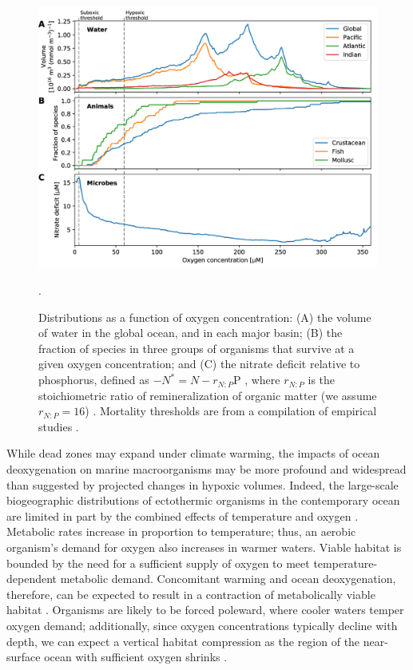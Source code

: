 \documentclass{report_chapter}
\begin{document}
\begin{figure}[p!]
\centering
\includegraphics[width=\textwidth]{woa_o2pdf_mortality_no3deficit.png}
\caption{Distributions as a function of oxygen concentration:
(A) the volume of water in the global ocean, and in each major basin; (B) the fraction of species in three groups of organisms that survive at a given oxygen concentration; and (C) the nitrate deficit relative to phosphorus, defined as ${-N^* = N - r_{N:P}\mathrm{P}}$ \protect\citep{Gruber-Sarmiento-1997}, where ${r_{N:P}}$ is the stoichiometric ratio of remineralization of organic matter (we assume ${r_{N:P} = 16}$) \protect\citep{Anderson-Sarmiento-1994}.  Mortality thresholds are from a compilation of empirical studies \citep{Vaquer-Sunyer-Duarte-2008}.}.
\label{fig:o2pdfs}
\end{figure}

While dead zones may expand under climate warming, the impacts of ocean deoxygenation on marine macroorganisms may be more profound and widespread than suggested by projected changes in hypoxic volumes.
Indeed, the large-scale biogeographic distributions of ectothermic organisms in the contemporary ocean are limited in part by the combined effects of temperature and oxygen \citep{Deutsch-Ferrel-etal-2015}.
Metabolic rates increase in proportion to temperature; thus, an aerobic organism's demand for oxygen also increases in warmer waters.
Viable habitat is bounded by the need for a sufficient supply of oxygen to meet temperature-dependent metabolic demand.
Concomitant warming and ocean deoxygenation, therefore, can be expected to result in a contraction of metabolically viable habitat \citep{Deutsch-Ferrel-etal-2015}.
Organisms are likely to be forced poleward, where cooler waters temper oxygen demand; additionally, since oxygen concentrations typically decline with depth, we can expect a vertical habitat compression as the region of the near-surface ocean with sufficient oxygen shrinks \citep{Koslow-Goericke-etal-2011}.
\end{document}
